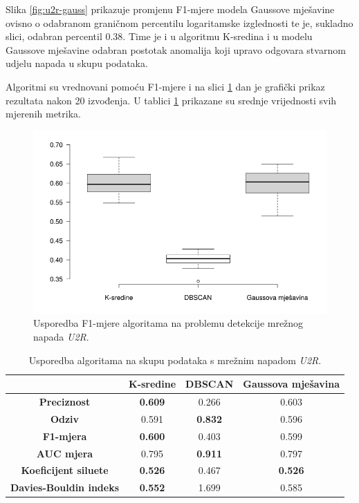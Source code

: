 \documentclass[utf8, diplomski, numeric]{fer}
\begin{document}
Slika \ref{fig:u2r-gauss} prikazuje promjenu F1-mjere modela Gaussove mješavine ovisno o odabranom graničnom percentilu logaritamske izglednosti te je, sukladno slici, odabran percentil 0.38. Time je i u algoritmu K-sredina i u modelu Gaussove mješavine odabran postotak anomalija koji upravo odgovara stvarnom udjelu napada u skupu podataka.

Algoritmi su vrednovani pomoću F1-mjere i na slici \ref{fig:u2r-f1} dan je grafički prikaz rezultata nakon 20 izvođenja. U tablici \ref{tab:u2r} prikazane su srednje vrijednosti svih mjerenih metrika.

\begin{figure}[h!]
\includegraphics[width=1\textwidth]{images/u2r-f1.png}
\centering
\caption{Usporedba F1-mjere algoritama na problemu detekcije mrežnog napada \textit{U2R}.}
\label{fig:u2r-f1}
\end{figure}

\begin{table}[h!]
  \begin{center}
    \caption{Usporedba algoritama na skupu podataka s mrežnim napadom \textit{U2R}.}
    \label{tab:u2r}
    \begin{tabular}{c|c|c|c} 
      & \textbf{K-sredine} & \textbf{DBSCAN}  & \textbf{Gaussova mješavina}\\
      \hline
      \textbf{Preciznost} & \textbf{0.609} & 0.266 & 0.603 \\
      \textbf{Odziv} & 0.591 & \textbf{0.832} & 0.596 \\
      \textbf{F1-mjera} & \textbf{0.600} & 0.403 & 0.599 \\
      \textbf{AUC mjera} & 0.795 & \textbf{0.911} & 0.797 \\
       \textbf{Koeficijent siluete} & \textbf{0.526} & 0.467 & \textbf{0.526} \\
       \textbf{Davies-Bouldin indeks} & \textbf{0.552} & 1.699 & 0.585 \\
     \end{tabular}
  \end{center}
\end{table}
\end{document}

